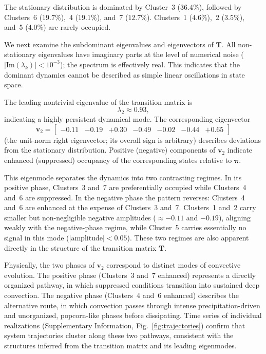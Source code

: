 \documentclass[11pt]{article}
\begin{document}
The stationary distribution is dominated by Cluster~3 ($36.4\%$), followed by Clusters~6 ($19.7\%$),~4 ($19.1\%$), and~7 ($12.7\%$). Clusters~1 ($4.6\%$),~2 ($3.5\%$), and~5 ($4.0\%$) are rarely occupied.

We next examine the subdominant eigenvalues and eigenvectors of
$\mathbf{T}$.
All non-stationary eigenvalues have imaginary parts at the level of numerical noise ($|\mathrm{Im}(\lambda_k)|<10^{-3}$); the spectrum is effectively real. This indicates that the dominant dynamics cannot be described as simple linear oscillations in state space.

The leading nontrivial eigenvalue of the transition matrix is
\begin{equation}
\lambda_2 \approx 0.93,
\end{equation}
indicating a highly persistent dynamical mode. The corresponding eigenvector
\begin{equation}
\mathbf{v}_2 =
\begin{bmatrix}
-0.11 & -0.19 & +0.30 & -0.49 & -0.02 & -0.44 & +0.65
\end{bmatrix}
\end{equation}
(the unit-norm right eigenvector; its overall sign is arbitrary) describes deviations from the stationary distribution. Positive (negative) components of $\mathbf{v}_2$ indicate enhanced (suppressed) occupancy of the corresponding states relative to $\boldsymbol{\pi}$.

This eigenmode separates the dynamics into two contrasting regimes. In its positive phase, Clusters~3 and~7 are preferentially occupied while Clusters~4 and~6 are suppressed. In the negative phase the pattern reverses: Clusters~4 and~6 are enhanced at the expense of Clusters~3 and~7. Clusters~1 and~2 carry smaller but non-negligible negative amplitudes ($\approx -0.11$ and $-0.19$), aligning weakly with the negative-phase regime, while Cluster~5 carries essentially no signal in this mode ($|\mathrm{amplitude}|<0.05$). These two regimes are also apparent directly in the structure of the transition matrix $\mathbf{T}$.

Physically, the two phases of $\mathbf{v}_2$ correspond to distinct modes of convective evolution.
The positive phase (Clusters~3 and~7 enhanced) represents a directly organized pathway, in which
suppressed conditions transition into sustained deep convection. The negative phase (Clusters~4 and~6
enhanced) describes the alternative route, in which convection passes through intense
precipitation-driven and unorganized, popcorn-like phases before dissipating.
Time series of individual realizations (Supplementary Information, Fig.~\ref{fig:trajectories}) confirm that system trajectories cluster along these two pathways, consistent with the structures inferred from the transition matrix and its leading eigenmodes.
\end{document}
